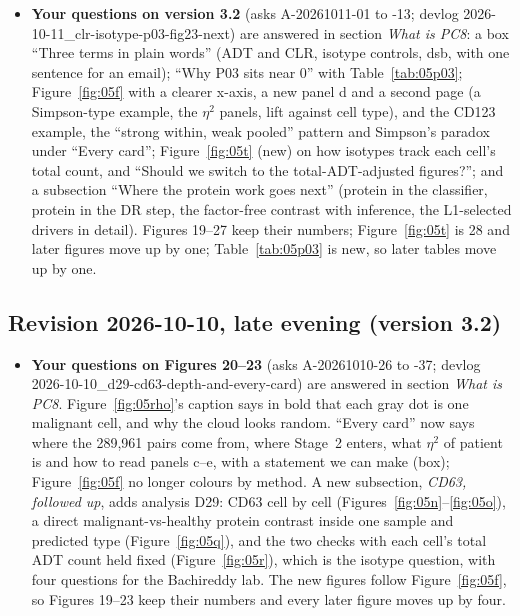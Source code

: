 \documentclass[11pt]{article}
\begin{document}
\begin{itemize}[leftmargin=1.4em]
\item \textbf{Your questions on version 3.2} (asks A-20261011-01 to -13; devlog 2026-10-11\_clr-isotype-p03-fig23-next) are answered in section \emph{What is PC8}: a box ``Three terms in plain words'' (ADT and CLR, isotype controls, dsb, with one sentence for an email); ``Why P03 sits near 0'' with Table~\ref{tab:05p03}; Figure~\ref{fig:05f} with a clearer x-axis, a new panel d and a second page (a Simpson-type example, the $\eta^2$ panels, lift against cell type), and the CD123 example, the ``strong within, weak pooled'' pattern and Simpson's paradox under ``Every card''; Figure~\ref{fig:05t} (new) on how isotypes track each cell's total count, and ``Should we switch to the total-ADT-adjusted figures?''; and a subsection ``Where the protein work goes next'' (protein in the classifier, protein in the DR step, the factor-free contrast with inference, the L1-selected drivers in detail). Figures 19--27 keep their numbers; Figure~\ref{fig:05t} is 28 and later figures move up by one; Table~\ref{tab:05p03} is new, so later tables move up by one.
\end{itemize}

\subsection*{Revision 2026-10-10, late evening (version 3.2)}

\begin{itemize}[leftmargin=1.4em]
\item \textbf{Your questions on Figures 20--23} (asks A-20261010-26 to -37; devlog 2026-10-10\_d29-cd63-depth-and-every-card) are answered in section \emph{What is PC8}. Figure~\ref{fig:05rho}'s caption says in bold that each gray dot is one malignant cell, and why the cloud looks random. ``Every card'' now says where the 289,961 pairs come from, where Stage~2 enters, what $\eta^2$ of patient is and how to read panels c--e, with a statement we can make (box); Figure~\ref{fig:05f} no longer colours by method. A new subsection, \emph{CD63, followed up}, adds analysis D29: CD63 cell by cell (Figures~\ref{fig:05n}--\ref{fig:05o}), a direct malignant-vs-healthy protein contrast inside one sample and predicted type (Figure~\ref{fig:05q}), and the two checks with each cell's total ADT count held fixed (Figure~\ref{fig:05r}), which is the isotype question, with four questions for the Bachireddy lab. The new figures follow Figure~\ref{fig:05f}, so Figures 19--23 keep their numbers and every later figure moves up by four.
\end{itemize}
\end{document}

